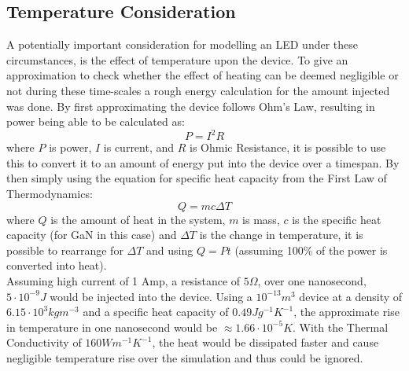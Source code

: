 \documentclass[titlepage]{article}
\begin{document}
\subsection{Temperature Consideration}
A potentially important consideration for modelling an LED under these circumstances, is the effect of temperature upon the device. To give an approximation to check whether the effect of heating can be deemed negligible or not during these time-scales a rough energy calculation for the amount injected was done. By first approximating the device follows Ohm's Law, resulting in power being able to be calculated as:
\begin{equation}
P = I^2 R
\end{equation}
where $P$ is power, $I$ is current, and $R$ is Ohmic Resistance,	it is possible to use this to convert it to an amount of energy put into the device over a timespan. By then simply using the equation for specific heat capacity from the First Law of Thermodynamics:
\begin{equation}
Q = mc\Delta T 
\end{equation}
where $Q$ is the amount of heat in the system, $m$ is mass, $c$ is the specific heat capacity (for GaN in this case) and $\Delta T$ is the change in temperature,	it is possible to rearrange for $\Delta T$ and using $Q = Pt$ (assuming 100\% of the power is converted into heat). \\
Assuming high current of 1 Amp, a resistance of $5\Omega$, over one nanosecond, $5\cdot10^{-9} J$ would be injected into the device. Using a $10^{-13}m^3$ device at a density of $6.15\cdot 10^3 kg m^{-3}$\cite{NSD} and a specific heat capacity of $0.49Jg^{-1}K^{-1}$\cite{GaN_Heatcap}, the approximate rise in temperature in one nanosecond would be $\approx 1.66 \cdot 10^{-5} K$. With the Thermal Conductivity of $160 Wm^{-1}K^{-1}$\cite{NSD}, the heat would be dissipated faster and cause negligible temperature rise over the simulation and thus could be ignored.
\end{document}
